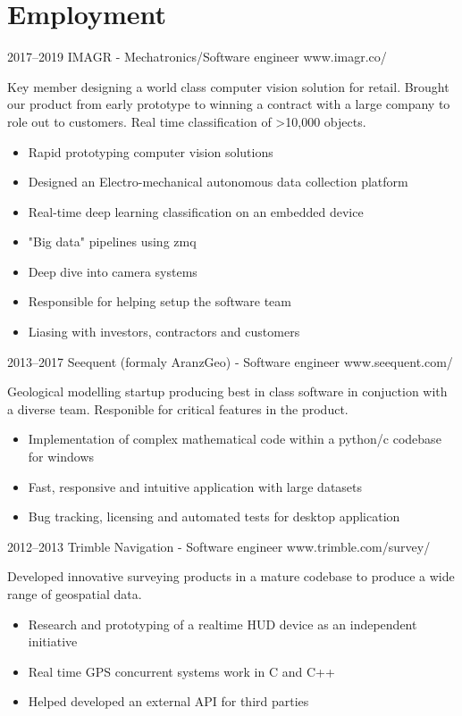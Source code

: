 \documentclass[print]{friggeri-cv} %
\begin{document}
\section{Employment}
\begin{entrylist}
\entry
{2017--2019}
{IMAGR - Mechatronics/Software engineer}
{www.imagr.co/}
{Key member designing a world class computer vision solution for retail. Brought our product from early prototype to winning a contract with a large company to role out to customers. Real time classification of >10,000 objects.
\begin{itemize}
\item Rapid prototyping computer vision solutions
\item Designed an Electro-mechanical autonomous data collection platform
\item Real-time deep learning classification on an embedded device
\item "Big data" pipelines using zmq
\item Deep dive into camera systems
\item Responsible for helping setup the software team
\item Liasing with investors, contractors and customers
\end{itemize}}

\entry
{2013--2017}
{Seequent (formaly AranzGeo) - Software engineer}
{www.seequent.com/}
{Geological modelling startup producing best in class software in conjuction with a diverse team. Responible for critical features in the product.
\begin{itemize}
\item Implementation of complex mathematical code within a python/c codebase for windows
\item Fast, responsive and intuitive application with large datasets
\item Bug tracking, licensing and automated tests for desktop application
\end{itemize}}

\entry
{2012--2013}
{Trimble Navigation - Software engineer}
{www.trimble.com/survey/}
{Developed innovative surveying products in a mature codebase to produce a wide range of geospatial data.
\begin{itemize}
\item Research and prototyping of a realtime HUD device as an independent initiative
\item Real time GPS concurrent systems work in C and C++
\item Helped developed an external API for third parties
\end{itemize}}


\end{entrylist}
\end{document}
